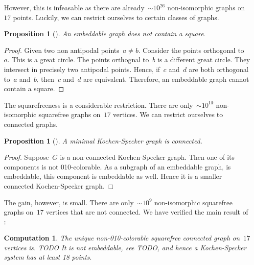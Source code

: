 \documentclass[a4paper]{article}
\newcounter{main}
\newtheorem{prop}[main]{Proposition}
\newtheorem{comp}[main]{Computation}
\theoremstyle{definition}
\theoremstyle{remark}
\begin{document}
However, this is infeasable as there are
already~${\sim}10^{26}$ non-isomorphic
graphs on~$17$ points.
Luckily, we can restrict ourselves to certain classes of graphs.
\begin{prop}[\cite{aow11}]
    An embeddable graph does not contain a square.
\end{prop}
\begin{proof}
    Given two non antipodal points~$a\neq b$.
    Consider the points orthogonal to~$a$.
    This is a great circle.
    The points orthognal to~$b$ is a different great circle.
    They intersect in precisely two antipodal points.
    Hence, if~$c$ and~$d$ are both orthogonal to~$a$ and~$b$,
    then~$c$ and~$d$ are equivalent.
    Therefore, an embeddable graph cannot contain a square.
\end{proof}
The squarefreeness is a considerable restriction.  There are
only~${\sim}10^{10}$ non-isomorphic squarefree graphs on~$17$ vertices.
We can restrict ourselves to connected graphs.
\begin{prop}[\cite{aow11}]\label{prop:ks-conn}
    A minimal Kochen-Specker graph is connected.
\end{prop}
\begin{proof}
    Suppose~$G$ is a non-connected Kochen-Specker graph.
    Then one of its components is not 010-colorable.
    As a subgraph of an embeddable graph, is embeddable,
    this component is embeddable as well.
    Hence it is a smaller connected Kochen-Specker graph.
\end{proof}
The gain, however, is small.
There are only~${\sim}10^9$ non-isomorphic squarefree graphs on~$17$
vertices that are not connected.
We have verified the main result of \cite{aow11}:
\begin{comp}
The unique non-010-colorable squarefree connected graph on~$17$
vertices is. TODO
It is not embeddable, see TODO, and hence a Kochen-Specker
system has at least 18 points.
\end{comp}
\end{document}
